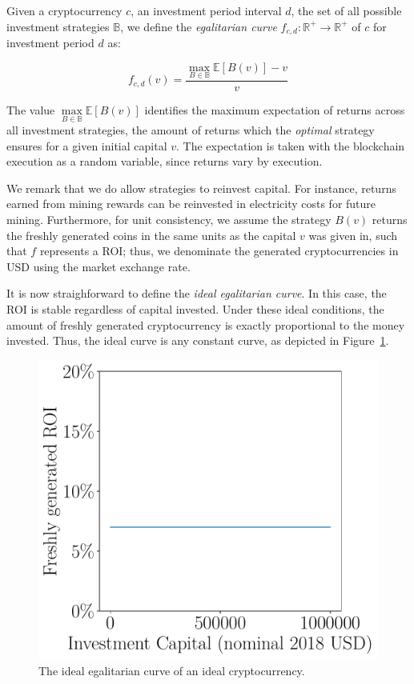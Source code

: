 \begin{definition}
    Given a cryptocurrency $c$, an investment period interval $d$, the set of
    all possible investment strategies $\mathbb{B}$, we define the \emph{egalitarian curve}
    $f_{c,d}: \mathbb{R}^+ \longrightarrow \mathbb{R}^+$ of $c$ for
    investment period $d$ as:

    \[
        f_{c,d}(v) = \frac{\underset{B \in \mathbb{B}}{\max}{\mathbb{E}[B(v)]} - v}{v}
    \]
\end{definition}

The value $\underset{B \in \mathbb{B}}{\max}{\mathbb{E}[B(v)]}$ identifies the maximum expectation of
returns across all investment strategies, \ie the amount of
returns which the \emph{optimal} strategy ensures for a given initial capital $v$.
The expectation is taken with the blockchain execution as a random variable,
since returns vary by execution.

We remark that we do allow strategies to reinvest capital. For instance,
returns earned from mining rewards can be reinvested in electricity costs for
future mining. Furthermore, for unit consistency, we assume the strategy
$B(v)$ returns the freshly generated coins in the same units as the capital $v$
was given in, such that $f$ represents a ROI; thus, we denominate the
generated cryptocurrencies in USD using the market exchange rate.

It is now straighforward to define the \emph{ideal egalitarian curve}. In this
case, the ROI is stable regardless of capital invested. Under these ideal
conditions, the amount of freshly generated cryptocurrency is exactly
proportional to the money invested. Thus, the ideal curve is any constant
curve, as depicted in Figure~\ref{fig:ideal}.

\begin{figure}
    \centering
    \includegraphics[width=0.5 \columnwidth,keepaspectratio]{figures/ideal.pdf}
    \caption{The ideal egalitarian curve of an ideal cryptocurrency.}
    \label{fig:ideal}
\end{figure}

